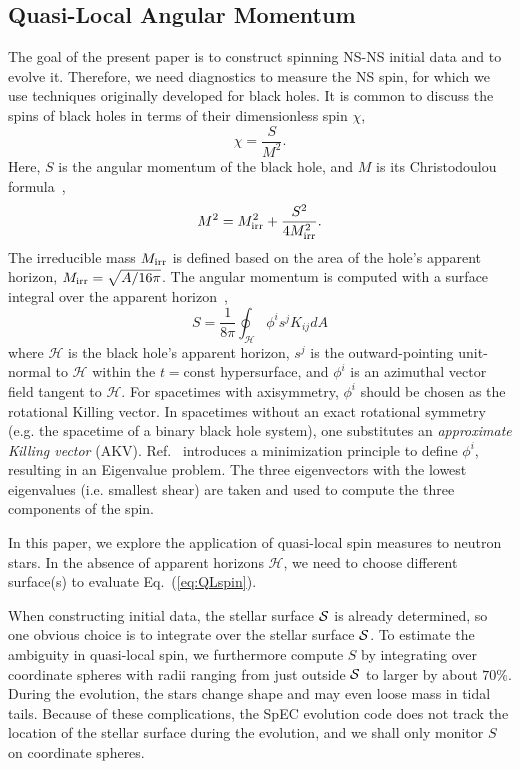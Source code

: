 \documentclass[aps,prd,amsmath,floatfix
,twocolumn
,superscriptaddress,nofootinbib,showpacs]{revtex4-1}
\theoremstyle{plain} \newtheorem{thm}{Theorem} \newtheorem{lem}{Lemma}
\begin{document}
\subsection{Quasi-Local Angular Momentum}
\label{sec:QLSpinExplanation}

The goal of the present paper is to construct spinning NS-NS initial data and to evolve it.  Therefore, we need diagnostics to measure the NS spin, for which we use techniques originally developed for black holes.
It is common to discuss the spins of black holes in terms of their
dimensionless spin $\chi$,
\begin{equation}\label{eq:chi}
\chi = \frac{S}{M^2}.
\end{equation}
Here, $S$ is the angular momentum of the black hole, and $M$ is its
Christodoulou formula~\cite{Christodoulou70},
\begin{equation}\label{eq:ChristodoulouMass}
M^2 = M_{\rm irr}^2 + \frac{S^2}{4M_{\rm irr}^2}.
\end{equation}
The irreducible mass $M_{\rm irr}$ is defined based on the area of the
hole's apparent horizon, $M_{\rm irr}=\sqrt{A/16\pi}$. The angular
momentum is computed with a surface integral over the apparent
horizon~\cite{BrownYork1993,Ashtekar2001,Ashtekar2003},
\begin{equation}\label{eq:QLspin}
S= \frac{1}{8\pi}\oint_{\mathcal{H}}\phi^is^jK_{ij}dA
\end{equation}
where $\mathcal{H}$ is the black hole's apparent horizon, $s^j$ is the
outward-pointing unit-normal to $\mathcal{H}$ within the $t=$const
hypersurface, and $\phi^i$ is an azimuthal vector field tangent to
$\mathcal{H}$.  For spacetimes with axisymmetry, $\phi^i$ should be
chosen as the rotational Killing vector.  In spacetimes without an
exact rotational symmetry (e.g. the spacetime of a binary black hole
system), one substitutes an \emph{approximate Killing
  vector}\cite{Cook2007,Lovelace2008} (AKV).  Ref.~\cite{Lovelace2008}
introduces a minimization principle to define $\phi^i$, resulting in
an Eigenvalue problem. The three eigenvectors with the lowest
eigenvalues (i.e. smallest shear) are taken and used to compute
the three components of the spin.

In this paper, we explore the application of quasi-local spin measures
to neutron stars.  In the absence of apparent horizons $\mathcal{H}$,
we need to choose different surface(s) to evaluate Eq.~(\ref{eq:QLspin}). 

When constructing initial data, the stellar surface ${\cal S}$ is
already determined, so one obvious choice is to integrate over the
stellar surface ${\cal S}$.  To estimate the ambiguity in quasi-local
spin, we furthermore compute $S$ by integrating over coordinate
spheres with radii ranging from just outside ${\cal S}$ to larger by
about $70\%$.  During the evolution, the stars change shape and
may even loose mass in tidal tails.  Because of these complications,
the SpEC evolution code does not track the location of the
stellar surface during the evolution, and we shall only
monitor $S$ on coordinate spheres.
\end{document}
